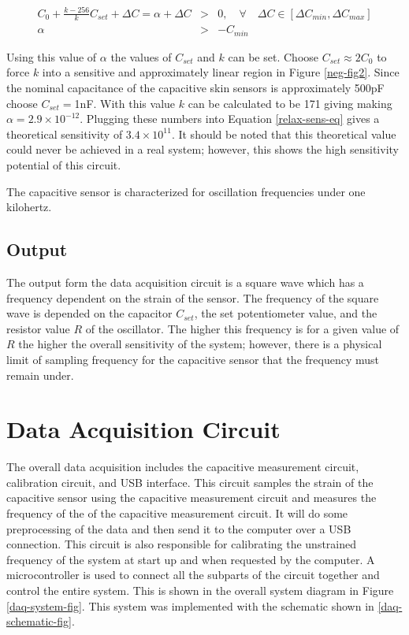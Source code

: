 \begin{eqnarray}
	C_0+\frac{k-256}{k}C_{set}+\Delta C = \alpha + \Delta C &>& 0, \quad\forall\quad \Delta C\in[\Delta C_{min}, \Delta C_{max}]\label{relax-eq10}\\
	\alpha &>& -C_{min}\label{relax-eq11}
\end{eqnarray}

Using this value of $\alpha$ the values of $C_{set}$ and $k$ can be set.  Choose $C_{set}\approx 2C_0$ to force $k$ into a sensitive and approximately linear region in Figure \ref{neg-fig2}.  Since the nominal capacitance of the capacitive skin sensors is approximately 500pF choose $C_{set}=$1nF.  With this value $k$ can be calculated to be 171 giving making $\alpha=2.9\times10^{-12}$.  Plugging these numbers into Equation \ref{relax-sens-eq} gives a theoretical sensitivity of $3.4\times10^{11}$.  It should be noted that this theoretical value could never be achieved in a real system; however, this shows the high sensitivity potential of this circuit.

The capacitive sensor is characterized for oscillation frequencies under one kilohertz.  

\subsection{Output}
The output form the data acquisition circuit is a square wave which has a frequency dependent on the strain of the sensor.  The frequency of the square wave is depended on the capacitor $C_{set}$, the set potentiometer value, and the resistor value $R$ of the oscillator.  The higher this frequency is for a given value of $R$ the higher the overall sensitivity of the system; however, there is a physical limit of sampling frequency for the capacitive sensor that the frequency must remain under.

\section{Data Acquisition Circuit}
The overall data acquisition includes the capacitive measurement circuit, calibration circuit, and USB interface.  This circuit samples the strain of the capacitive sensor using the capacitive measurement circuit and measures the frequency of the of the capacitive measurement circuit.  It will do some preprocessing of the data and then send it to the computer over a USB connection.  This circuit is also responsible for calibrating the unstrained frequency of the system at start up and when requested by the computer.  A microcontroller is used to connect all the subparts of the circuit together and control the entire system.  This is shown in the overall system diagram in Figure \ref{daq-system-fig}.  This system was implemented with the schematic shown in \ref{daq-schematic-fig}.

